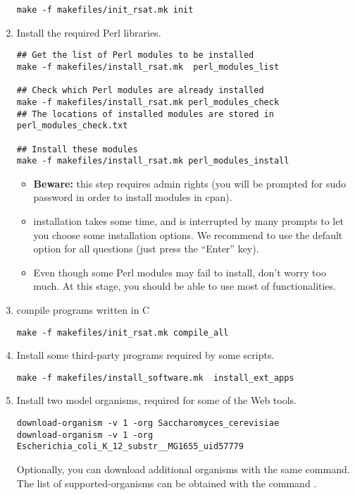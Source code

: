 \documentclass[12pt,a4paper, oneside]{scrreprt} %
\begin{document}
\begin{enumerate}
  \begin{lstlisting}
make -f makefiles/init_rsat.mk init
  \end{lstlisting}
  
\item Install the required Perl libraries.

  \begin{lstlisting}
## Get the list of Perl modules to be installed
make -f makefiles/install_rsat.mk  perl_modules_list

## Check which Perl modules are already installed
make -f makefiles/install_rsat.mk perl_modules_check
## The locations of installed modules are stored in perl_modules_check.txt

## Install these modules
make -f makefiles/install_rsat.mk perl_modules_install
  \end{lstlisting}


  \begin{itemize}
  \item \textbf{Beware: } this step requires admin rights (you will be
    prompted for sudo password in order to install modules in cpan).
    
  \item {} installation takes some time, and is interrupted
    by many prompts to let you choose some installation options. We
    recommend to use the default option for all questions (just press
    the ``Enter'' key).
    
  \item Even though some Perl modules may fail to install, don't worry
    too much. At this stage, you should be able to use most of \RSAT
    functionalities.
  \end{itemize}

\item compile \RSAT programs written in C

\begin{lstlisting}
make -f makefiles/init_rsat.mk compile_all
\end{lstlisting}

\item Install some third-party programs required by some \RSAT
  scripts.

\begin{lstlisting}
make -f makefiles/install_software.mk  install_ext_apps
\end{lstlisting}


\item Install two model organisms, required for some of the Web tools.

  \begin{lstlisting}
download-organism -v 1 -org Saccharomyces_cerevisiae
download-organism -v 1 -org Escherichia_coli_K_12_substr__MG1655_uid57779
  \end{lstlisting}
  
  Optionally, you can download additional organisms with the same
  command. The list of supported-organisms can be obtained with the
  command .

\end{enumerate}
\end{document}
